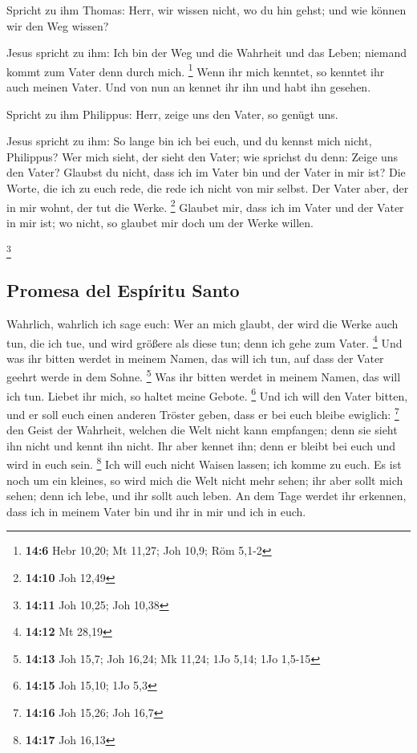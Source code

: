  Spricht zu ihm Thomas: Herr, wir wissen nicht, wo du hin
gehst; und wie können wir den Weg wissen?

 Jesus spricht zu ihm: Ich bin der Weg und die Wahrheit
und das Leben; niemand kommt zum Vater denn durch mich. \footnote{\textbf{14:6}
  Hebr 10,20; Mt 11,27; Joh 10,9; Röm 5,1-2}  Wenn ihr
mich kenntet, so kenntet ihr auch meinen Vater. Und von nun an kennet
ihr ihn und habt ihn gesehen.

 Spricht zu ihm Philippus: Herr, zeige uns den Vater, so
genügt uns.

 Jesus spricht zu ihm: So lange bin ich bei euch, und du
kennst mich nicht, Philippus? Wer mich sieht, der sieht den Vater; wie
sprichst du denn: Zeige uns den Vater?  Glaubst du nicht,
dass ich im Vater bin und der Vater in mir ist? Die Worte, die ich zu
euch rede, die rede ich nicht von mir selbst. Der Vater aber, der in mir
wohnt, der tut die Werke. \footnote{\textbf{14:10} Joh 12,49}
 Glaubet mir, dass ich im Vater und der Vater in mir ist;
wo nicht, so glaubet mir doch um der Werke willen.

\footnote{\textbf{14:11} Joh 10,25; Joh 10,38}

\hypertarget{promesa-del-espuxedritu-santo}{%
\subsection{Promesa del Espíritu
Santo}\label{promesa-del-espuxedritu-santo}}

 Wahrlich, wahrlich ich sage euch: Wer an mich glaubt,
der wird die Werke auch tun, die ich tue, und wird größere als diese
tun; denn ich gehe zum Vater. \footnote{\textbf{14:12} Mt 28,19}
 Und was ihr bitten werdet in meinem Namen, das will ich
tun, auf dass der Vater geehrt werde in dem Sohne. \footnote{\textbf{14:13}
  Joh 15,7; Joh 16,24; Mk 11,24; 1Jo 5,14; 1Jo 1,5-15} 
Was ihr bitten werdet in meinem Namen, das will ich tun. 
Liebet ihr mich, so haltet meine Gebote. \footnote{\textbf{14:15} Joh
  15,10; 1Jo 5,3}  Und ich will den Vater bitten, und er
soll euch einen anderen Tröster geben, dass er bei euch bleibe ewiglich:
\footnote{\textbf{14:16} Joh 15,26; Joh 16,7}  den Geist
der Wahrheit, welchen die Welt nicht kann empfangen; denn sie sieht ihn
nicht und kennt ihn nicht. Ihr aber kennet ihn; denn er bleibt bei euch
und wird in euch sein. \footnote{\textbf{14:17} Joh 16,13}
 Ich will euch nicht Waisen lassen; ich komme zu euch.
 Es ist noch um ein kleines, so wird mich die Welt nicht
mehr sehen; ihr aber sollt mich sehen; denn ich lebe, und ihr sollt auch
leben.  An dem Tage werdet ihr erkennen, dass ich in
meinem Vater bin und ihr in mir und ich in euch.

